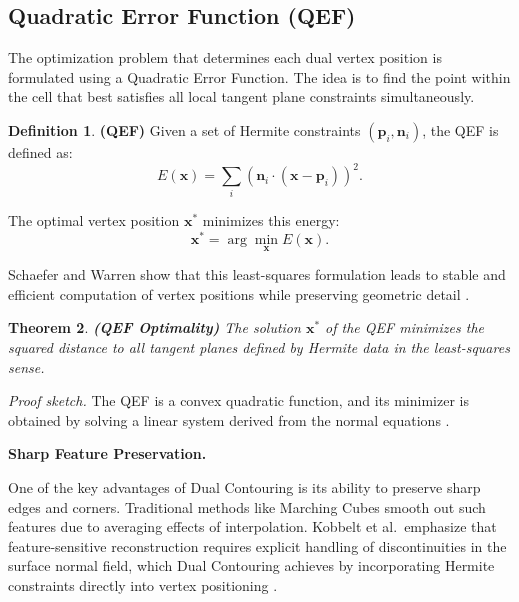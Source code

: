\documentclass[12pt, a4paper, oneside]{book}
\theoremstyle{plain}
\newtheorem{theorem}{Theorem}[chapter]
\theoremstyle{definition}
\newtheorem{definition}[theorem]{Definition}
\theoremstyle{remark}
\theoremstyle{definition}
\begin{document}
\vspace{0.5em}

\subsection{Quadratic Error Function (QEF)}

The optimization problem that determines each dual vertex position is formulated using a
Quadratic Error Function. The idea is to find the point within the cell that best
satisfies all local tangent plane constraints simultaneously.

\begin{definition}
\textbf{(QEF)}
Given a set of Hermite constraints $(\mathbf{p}_i, \mathbf{n}_i)$, the QEF is defined
as:
\[
E(\mathbf{x}) = \sum_i \left( \mathbf{n}_i \cdot (\mathbf{x} - \mathbf{p}_i) \right)^2.
\]
\end{definition}

The optimal vertex position $\mathbf{x}^*$ minimizes this energy:
\[
\mathbf{x}^* = \arg\min_{\mathbf{x}} E(\mathbf{x}).
\]

Schaefer and Warren show that this least-squares formulation leads to stable and efficient
computation of vertex positions while preserving geometric detail
\cite{schaefer2005qef,ju2002dual}.

\vspace{0.5em}

\begin{theorem}
    \textbf{(QEF Optimality)}
The solution $\mathbf{x}^*$ of the QEF minimizes the squared distance to all tangent
planes defined by Hermite data in the least-squares sense.
\end{theorem}

\textit{Proof sketch.} The QEF is a convex quadratic function, and its minimizer is
obtained by solving a linear system derived from the normal equations
\cite{schaefer2005qef}.

\vspace{0.5em}

\textbf{Sharp Feature Preservation.}

One of the key advantages of Dual Contouring is its ability to preserve sharp edges and
corners. Traditional methods like Marching Cubes smooth out such features due to
averaging effects of interpolation. Kobbelt et al.\ emphasize that feature-sensitive
reconstruction requires explicit handling of discontinuities in the surface normal field,
which Dual Contouring achieves by incorporating Hermite constraints directly into vertex
positioning \cite{kobbelt2001feature}.
\end{document}
